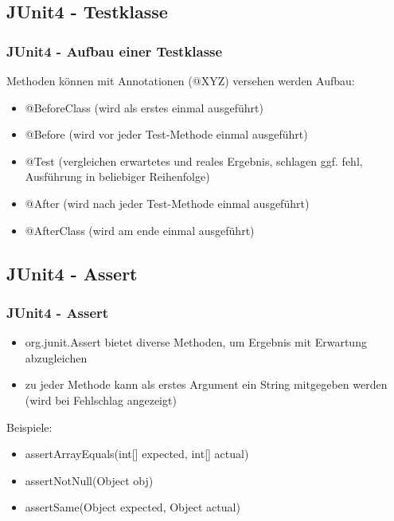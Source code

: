 \documentclass[18pt]{beamer}
\begin{document}
	\subsection{JUnit4 - Testklasse}
	\begin{frame}
		\frametitle{JUnit4 - Aufbau einer Testklasse}
		Methoden können mit Annotationen (@XYZ) versehen werden \linebreak
		Aufbau:
		\begin{itemize}
			\item @BeforeClass (wird als erstes einmal ausgeführt)
			\pause
			\item @Before (wird vor jeder Test-Methode einmal ausgeführt)
			\pause
			\item @Test (vergleichen erwartetes und reales Ergebnis, schlagen ggf. fehl, Ausführung in beliebiger Reihenfolge)
			\pause
			\item @After (wird nach jeder Test-Methode einmal ausgeführt)
			\pause
			\item @AfterClass (wird am ende einmal ausgeführt)
		\end{itemize}
	\end{frame}
	
	\subsection{JUnit4 - Assert}
	\begin{frame}
		\frametitle{JUnit4 - Assert}
		\begin{itemize}
			\item org.junit.Assert bietet diverse Methoden, um Ergebnis mit Erwartung abzugleichen 
			\item zu jeder Methode kann als erstes Argument ein String mitgegeben werden (wird bei Fehlschlag angezeigt) \linebreak
		\end{itemize}
		Beispiele:
		\begin{itemize}
			\item assertArrayEquals(int[] expected, int[] actual)
			\item assertNotNull(Object obj)
			\item assertSame(Object expected, Object actual)
		\end{itemize}
	\end{frame}
	
\end{document}
